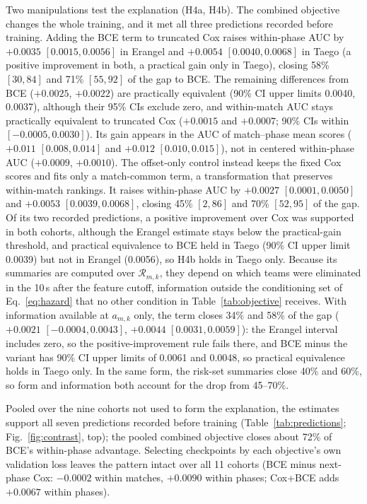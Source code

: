 \documentclass[sigconf,anonymous,nonacm]{acmart}
\begin{document}
Two manipulations test the explanation (H4a, H4b). The combined objective changes the whole training, and it met all three predictions recorded before training. Adding the BCE term to truncated Cox raises within-phase AUC by $+0.0035$ $[0.0015,\allowbreak 0.0056]$ in Erangel and $+0.0054$ $[0.0040,\allowbreak 0.0068]$ in Taego (a positive improvement in both, a practical gain only in Taego), closing 58\% $[30,\allowbreak 84]$ and 71\% $[55,\allowbreak 92]$ of the gap to BCE. The remaining differences from BCE ($+0.0025$, $+0.0022$) are practically equivalent (90\% CI upper limits 0.0040, 0.0037), although their 95\% CIs exclude zero, and within-match AUC stays practically equivalent to truncated Cox ($+0.0015$ and $+0.0007$; 90\% CIs within $[-0.0005,\allowbreak 0.0030]$). Its gain appears in the AUC of match--phase mean scores ($+0.011$ $[0.008,\allowbreak 0.014]$ and $+0.012$ $[0.010,\allowbreak 0.015]$), not in centered within-phase AUC ($+0.0009$, $+0.0010$). The offset-only control instead keeps the fixed Cox scores and fits only a match-common term, a transformation that preserves within-match rankings. It raises within-phase AUC by $+0.0027$ $[0.0001,\allowbreak 0.0050]$ and $+0.0053$ $[0.0039,\allowbreak 0.0068]$, closing 45\% $[2,\allowbreak 86]$ and 70\% $[52,\allowbreak 95]$ of the gap. Of its two recorded predictions, a positive improvement over Cox was supported in both cohorts, although the Erangel estimate stays below the practical-gain threshold, and practical equivalence to BCE held in Taego (90\% CI upper limit 0.0039) but not in Erangel (0.0056), so H4b holds in Taego only. Because its summaries are computed over $\mathcal{R}_{m,k}$, they depend on which teams were eliminated in the 10\,s after the feature cutoff, information outside the conditioning set of Eq.~\eqref{eq:hazard} that no other condition in Table~\ref{tab:objective} receives. With information available at $a_{m,k}$ only, the term closes 34\% and 58\% of the gap ($+0.0021$ $[-0.0004,\allowbreak 0.0043]$, $+0.0044$ $[0.0031,\allowbreak 0.0059]$): the Erangel interval includes zero, so the positive-improvement rule fails there, and BCE minus the variant has 90\% CI upper limits of 0.0061 and 0.0048, so practical equivalence holds in Taego only. In the same form, the risk-set summaries close 40\% and 60\%, so form and information both account for the drop from 45--70\%.


Pooled over the nine cohorts not used to form the explanation, the estimates support all seven predictions recorded before training (Table~\ref{tab:predictions}; Fig.~\ref{fig:contrast}, top); the pooled combined objective closes about 72\% of BCE's within-phase advantage. Selecting checkpoints by each objective's own validation loss leaves the pattern intact over all 11 cohorts (BCE minus next-phase Cox: $-0.0002$ within matches, $+0.0090$ within phases; Cox+BCE adds $+0.0067$ within phases).
\end{document}
